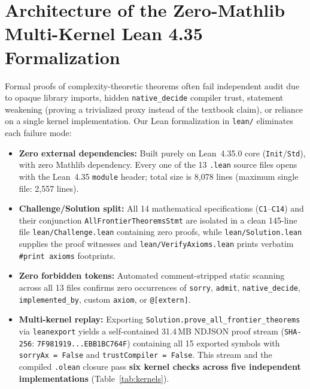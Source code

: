 \documentclass[11pt,reqno]{amsart}
\newcommand{\code}[1]{\texttt{\nolinkurl{#1}}}
\theoremstyle{definition}
\begin{document}
\section{Architecture of the Zero-Mathlib Multi-Kernel Lean 4.35 Formalization}
\label{sec:lean-arch}

Formal proofs of complexity-theoretic theorems often fail independent audit due to
opaque library imports, hidden \code{native_decide} compiler trust, statement
weakening (proving a trivialized proxy instead of the textbook claim), or reliance on a
single kernel implementation. Our Lean formalization in \texttt{lean/} eliminates each
failure mode:
\begin{itemize}[leftmargin=1.5em]
\item \textbf{Zero external dependencies:} Built purely on Lean~4.35.0 core
      (\texttt{Init}/\texttt{Std}), with zero Mathlib dependency. Every one of the 13
      \texttt{.lean} source files opens with the Lean~4.35 \texttt{module} header; total
      size is 8,078 lines (maximum single file: 2,557 lines).
\item \textbf{Challenge/Solution split:} All 14 mathematical specifications
      (\texttt{C1}--\texttt{C14}) and their conjunction \code{AllFrontierTheoremsStmt}
      are isolated in a clean 145-line file \code{lean/Challenge.lean} containing zero
      proofs, while \code{lean/Solution.lean} supplies the proof witnesses and
      \code{lean/VerifyAxioms.lean} prints verbatim \texttt{\#print axioms} footprints.
\item \textbf{Zero forbidden tokens:} Automated comment-stripped static scanning across
      all 13 files confirms zero occurrences of \texttt{sorry}, \texttt{admit},
      \code{native_decide}, \code{implemented_by}, custom \texttt{axiom}, or
      \texttt{@[extern]}.
\item \textbf{Multi-kernel replay:} Exporting \code{Solution.prove_all_frontier_theorems}
      via \texttt{leanexport} yields a self-contained 31.4\,MB NDJSON proof stream
      (\texttt{SHA-256}: \texttt{7F981919...EBB1BC764F}) containing all 15 exported
      symbols with \texttt{sorryAx = False} and \texttt{trustCompiler = False}. This
      stream and the compiled \texttt{.olean} closure pass \textbf{six kernel checks
      across five independent implementations} (Table~\ref{tab:kernels}).
\end{itemize}
\end{document}
